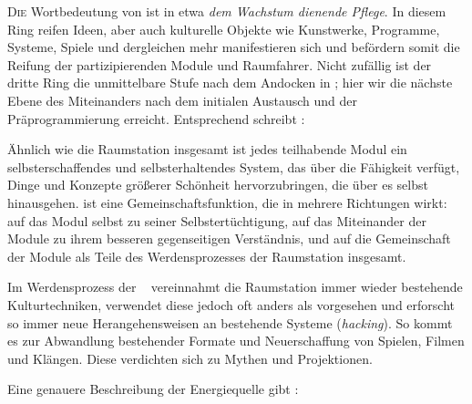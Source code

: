 \begin{newstuff}
    \lettrine{D}{ie} Wortbedeutung von  ist in etwa \emph{dem Wachstum dienende Pflege}. In diesem Ring reifen Ideen, aber auch kulturelle Objekte wie Kunstwerke, Programme, Systeme, Spiele und dergleichen mehr manifestieren sich und befördern somit die Reifung der partizipierenden Module und Raumfahrer. Nicht zufällig ist der dritte Ring die unmittelbare Stufe nach dem Andocken in ; hier wir die nächste Ebene des Miteinanders nach dem initialen Austausch und der Präprogrammierung erreicht. Entsprechend schreibt \cite[S. 67]{cbasebook}:


    Ähnlich wie die Raumstation insgesamt ist jedes teilhabende Modul ein selbsterschaffendes und selbsterhaltendes System, das über die Fähigkeit verfügt, Dinge und Konzepte größerer Schönheit hervorzubringen, die über es selbst hinausgehen.  ist eine Gemeinschaftsfunktion, die in mehrere Richtungen wirkt: auf das Modul selbst zu seiner Selbstertüchtigung, auf das Miteinander der Module zu ihrem besseren gegenseitigen Verständnis, und auf die Gemeinschaft der Module als Teile des Werdensprozesses der Raumstation insgesamt.

    Im Werdensprozess der \  vereinnahmt die Raumstation immer wieder bestehende Kulturtechniken, verwendet diese jedoch oft anders als vorgesehen und erforscht so immer neue Herangehensweisen an bestehende Systeme (\emph{hacking}). So kommt es zur Abwandlung bestehender Formate und Neuerschaffung von Spielen, Filmen und Klängen. Diese verdichten sich zu Mythen und Projektionen.

    Eine genauere Beschreibung der Energiequelle gibt \cite{cbasepressemap}:

        

\end{newstuff}
